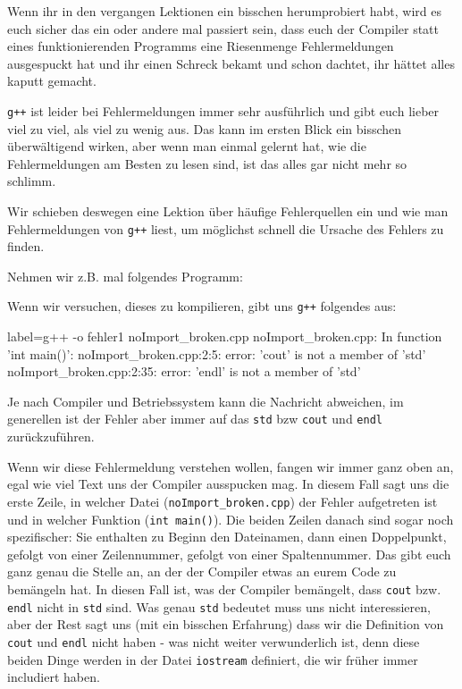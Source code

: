 
Wenn ihr in den vergangen Lektionen ein bisschen herumprobiert habt, wird es
euch sicher das ein oder andere mal passiert sein, dass euch der Compiler statt
eines funktionierenden Programms eine Riesenmenge Fehlermeldungen ausgespuckt
hat und ihr einen Schreck bekamt und schon dachtet, ihr hättet alles kaputt
gemacht.

\texttt{g++} ist leider bei Fehlermeldungen immer sehr ausführlich und gibt
euch lieber viel zu viel, als viel zu wenig aus. Das kann im ersten Blick ein
bisschen überwältigend wirken, aber wenn man einmal gelernt hat, wie die
Fehlermeldungen am Besten zu lesen sind, ist das alles gar nicht mehr so
schlimm.

Wir schieben deswegen eine Lektion über häufige Fehlerquellen ein und wie man
Fehlermeldungen von \texttt{g++} liest, um möglichst schnell die Ursache des
Fehlers zu finden.

Nehmen wir z.B. mal folgendes Programm:


Wenn wir versuchen, dieses zu kompilieren, gibt uns \texttt{g++} folgendes aus:

\begin{textcode*}{label=g++ -o fehler1 noImport\_broken.cpp}
    noImport\_broken.cpp: In function 'int main()':
    noImport\_broken.cpp:2:5: error: 'cout' is not a member of 'std'
    noImport\_broken.cpp:2:35: error: 'endl' is not a member of 'std'
\end{textcode*}

Je nach Compiler und Betriebssystem kann die Nachricht abweichen, im generellen ist der Fehler
aber immer auf das \texttt{std} bzw \texttt{cout} und \texttt{endl} zurückzuführen.

Wenn wir diese Fehlermeldung verstehen wollen, fangen wir immer ganz oben an,
egal wie viel Text uns der Compiler ausspucken mag. In diesem Fall sagt uns die
erste Zeile, in welcher Datei (\texttt{noImport\string_broken.cpp}) der Fehler aufgetreten ist
und in welcher Funktion (\texttt{int main()}). Die beiden Zeilen
danach sind sogar noch spezifischer: Sie enthalten zu Beginn den Dateinamen,
dann einen Doppelpunkt, gefolgt von einer Zeilennummer, gefolgt von einer
Spaltennummer. Das gibt euch ganz genau die Stelle an, an der der Compiler
etwas an eurem Code zu bemängeln hat. In diesen Fall ist, was der Compiler
bemängelt, dass \texttt{cout} bzw. \texttt{endl} nicht in \texttt{std} sind.
Was genau \texttt{std} bedeutet muss uns nicht interessieren, aber der Rest
sagt uns (mit ein bisschen Erfahrung) dass wir die Definition von \texttt{cout}
und \texttt{endl} nicht haben - was nicht weiter verwunderlich ist, denn diese
beiden Dinge werden in der Datei \texttt{iostream} definiert, die wir früher
immer includiert haben.

